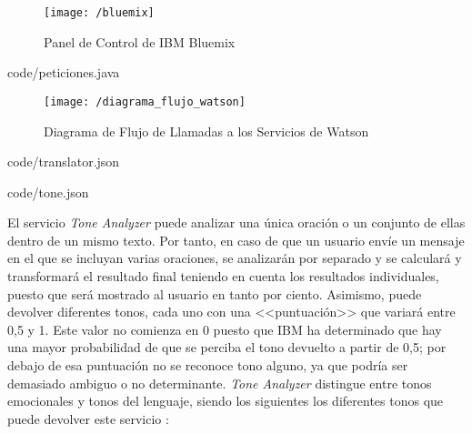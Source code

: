 \begin{figure}[!h]
	\begin{center}
		\texttt{[image: /bluemix]}
		\caption{Panel de Control de IBM Bluemix}
		\label{fig:bluemix}
	\end{center}
\end{figure}

\clearpage


						{code/peticiones.java}

\begin{figure}[!h]
	\begin{center}
		\texttt{[image: /diagrama\_flujo\_watson]}
		\caption{Diagrama de Flujo de Llamadas a los Servicios de Watson}
		\label{fig:diaflujo}
	\end{center}
\end{figure}

\clearpage


						{code/translator.json}


						{code/tone.json}

El servicio \textit{Tone Analyzer} puede analizar una única oración o un conjunto de ellas dentro de un mismo texto. Por tanto, en caso de que un usuario envíe un mensaje en el que se incluyan varias oraciones, se analizarán por separado y se calculará y transformará el resultado final teniendo en cuenta los resultados individuales, puesto que será mostrado al usuario en tanto por ciento. Asimismo, puede devolver diferentes tonos, cada uno con una <<puntuación>> que variará entre 0,5 y 1. Este valor no comienza en 0 puesto que IBM ha determinado que hay una mayor probabilidad de que se perciba el tono devuelto a partir de 0,5; por debajo de esa puntuación no se reconoce tono alguno, ya que podría ser demasiado ambiguo o no determinante. \textit{Tone Analyzer} distingue entre tonos emocionales y tonos del lenguaje, siendo los siguientes los diferentes tonos que puede devolver este servicio \cite{IBM2018}:


